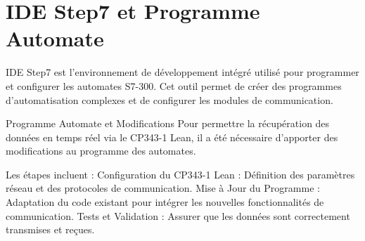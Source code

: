 
\section{IDE Step7 et Programme Automate}
IDE Step7 est l'environnement de développement intégré utilisé pour programmer et configurer les automates S7-300. Cet outil permet de créer des programmes d'automatisation complexes et de configurer les modules de communication.

Programme Automate et Modifications
Pour permettre la récupération des données en temps réel via le CP343-1 Lean, il a été nécessaire d'apporter des modifications au programme des automates. 

Les étapes incluent :
Configuration du CP343-1 Lean : Définition des paramètres réseau et des protocoles de communication.
Mise à Jour du Programme : Adaptation du code existant pour intégrer les nouvelles fonctionnalités de communication.
Tests et Validation : Assurer que les données sont correctement transmises et reçues.